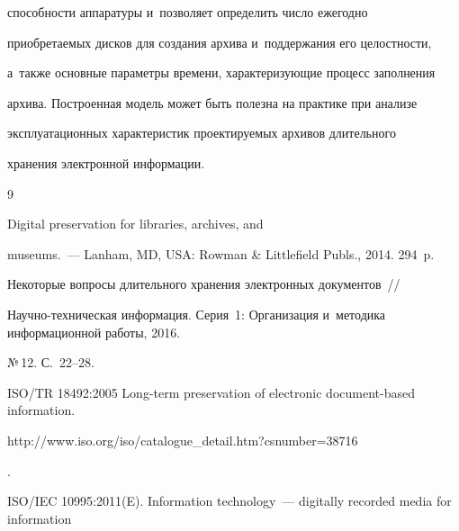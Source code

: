 способности аппаратуры и~позволяет определить число ежегодно 


приобретаемых дисков для создания архива и~поддержания его целостности, 


а~также основные параметры времени, характеризующие процесс заполнения 


архива. Построенная модель может быть полезна на практике при анализе 


эксплуатационных характеристик проектируемых архивов длительного 


хранения электронной информации.


  


{\small\frenchspacing


{%




\begin{thebibliography}{9}







   Digital preservation for libraries, archives, and 


museums.~--- Lanham, MD, USA: Rowman \& Littlefield Publs., 2014. 294~p.









Некоторые вопросы длительного хранения электронных документов~/\!\!/


Научно-техническая информация. Серия~1: Организация и~методика информационной работы, 2016.


№\,12. С.~22--28.


 


 




  ISO/TR 18492:2005 Long-term preservation of electronic document-based information. {\sf 


http://www.iso.org/iso/catalogue\_detail.htm?csnumber=38716}.







  ISO\!/\!IEC 10995:2011(E). Information technology~--- digitally recorded media for information 



\end{thebibliography}}}
